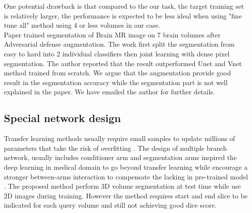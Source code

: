 One potential drawback is that compared to the our task, the target training set is relatively larger, the performance is expected to be less ideal when using "fine tune all" method using 4 or less volumes in our case.\\

Paper \cite{suk_brain_2019} trained segmentation of Brain MR image on 7 brain volumes after Adversarial defense augmentation. The work first split the segmentation from easy to hard into 2 individual classifiers then joint learning with dense pixel segmentation. The author reported that the result outperformed Unet and Vnet method trained from scratch. We argue that the augmentation provide good result in the segmentation accuracy while the segmentation part is not well explained in the paper. We have emailed the author for further details.

\subsection{Special network design}
Transfer learning methods usually require small samples to update millions of parameters that take the risk of overfitting \cite{shaban_one-shot_2017}. The design of multiple branch network, usually includes conditioner arm and segmentation arms inspired the deep learning in medical domain to go beyond transfer learning while encourage a stronger between-arms interaction to compensate the lacking in pre-trained model \cite{roy_squeeze_2019}. The proposed method perform 3D volume segmentation at test time while use 2D images during training. However the method requires start and end slice to be indicated for each query volume and still not achieving good dice score.

